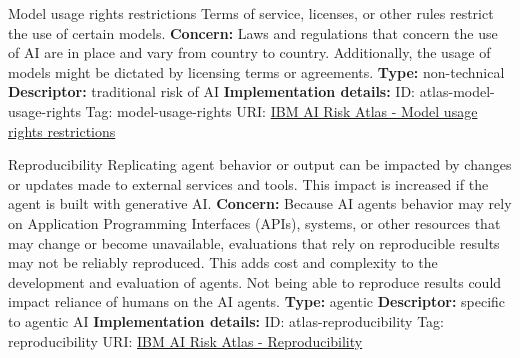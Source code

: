 \documentclass[a4paper,12pt]{article}
\begin{document}
\begin{definitionbox}{Model usage rights restrictions}
Terms of service, licenses, or other rules restrict the use of certain models.\newline\newline
\textbf{Concern: }Laws and regulations that concern the use of AI are in place and vary from country to country. Additionally, the usage of models might be dictated by licensing terms or agreements.\newline\newline
\textbf{Type: }non-technical\newline
\textbf{Descriptor: }traditional risk of AI \newline\newline
\textbf{Implementation details: } \newline
ID: atlas-model-usage-rights \newline
Tag: model-usage-rights \newline
URI:  \href{https://www.ibm.com/docs/en/watsonx/saas?topic=SSYOK8/wsj/ai-risk-atlas/model-usage-rights.html}{IBM AI Risk Atlas - Model usage rights restrictions}\newline
\end{definitionbox}
\begin{definitionbox}{Reproducibility}
Replicating agent behavior or output can be impacted by changes or updates made to external services and tools. This impact is increased if the agent is built with generative AI.\newline\newline
\textbf{Concern: }Because AI agents behavior may rely on Application Programming Interfaces (APIs), systems, or other resources that may change or become unavailable, evaluations that rely on reproducible results may not be reliably reproduced. This adds cost and complexity to the development and evaluation of agents. Not being able to reproduce results could impact reliance of humans on the AI agents.\newline\newline
\textbf{Type: }agentic\newline
\textbf{Descriptor: }specific to agentic AI \newline\newline
\textbf{Implementation details: } \newline
ID: atlas-reproducibility \newline
Tag: reproducibility \newline
URI:  \href{https://www.ibm.com/docs/en/watsonx/saas?topic=SSYOK8/wsj/ai-risk-atlas/reproducibility.html}{IBM AI Risk Atlas - Reproducibility}\newline
\end{definitionbox}
\end{document}
